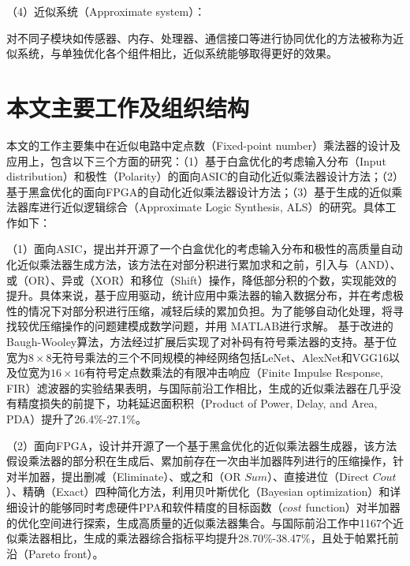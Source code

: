 （4）近似系统（Approximate system）：

对不同子模块如传感器、内存、处理器、通信接口等进行协同优化的方法被称为近似系统，与单独优化各个组件相比，近似系统能够取得更好的效果\cite{AC:Sys:camera}。




\section{本文主要工作及组织结构}

本文的工作主要集中在近似电路中定点数（Fixed-point number）乘法器的设计及应用上，包含以下三个方面的研究：（1）基于白盒优化的考虑输入分布（Input distribution）和极性（Polarity）的面向ASIC的自动化近似乘法器设计方法；（2）基于黑盒优化的面向FPGA的自动化近似乘法器设计方法；（3）基于生成的近似乘法器库进行近似逻辑综合（Approximate Logic Synthesis, ALS）\cite{AC:ALS:survey}的研究。具体工作如下：

（1）面向ASIC，提出并开源了一个白盒优化的考虑输入分布和极性的高质量自动化近似乘法器生成方法，该方法在对部分积进行累加求和之前，引入与（AND）、或（OR）、异或（XOR）和移位（Shift）操作，降低部分积的个数，实现能效的提升。具体来说，基于应用驱动，统计应用中乘法器的输入数据分布，并在考虑极性的情况下对部分积进行压缩，减轻后续的累加负担。为了能够自动化处理，将寻找较优压缩操作的问题建模成数学问题，并用 MATLAB进行求解。
基于改进的Baugh-Wooley算法\cite{EM:baugh-wooley,EM:baugh-wooley_modified_PP_reorga,EM:baugh-wooley_diff}，方法经过扩展后实现了对补码有符号乘法器的支持。基于位宽为$8\times8$无符号乘法的三个不同规模的神经网络包括LeNet、AlexNet和VGG16以及位宽为$16\times16$有符号定点数乘法的有限冲击响应（Finite Impulse Response, FIR）滤波器的实验结果表明，与国际前沿工作相比，生成的近似乘法器在几乎没有精度损失的前提下，功耗延迟面积积（Product of Power, Delay, and Area, PDA）提升了26.4\%-27.1\%。

（2）面向FPGA，设计并开源了一个基于黑盒优化的近似乘法器生成器，该方法假设乘法器的部分积在生成后、累加前存在一次由半加器阵列进行的压缩操作，针对半加器，提出删减（Eliminate）、或之和（OR $Sum$）、直接进位（Direct $Cout$）、精确（Exact）四种简化方法，利用贝叶斯优化（Bayesian optimization）和详细设计的能够同时考虑硬件PPA和软件精度的目标函数（$cost$ function）对半加器的优化空间进行探索，生成高质量的近似乘法器集合。与国际前沿工作中1167个近似乘法器相比，生成的乘法器综合指标平均提升28.70\%-38.47\%，且处于帕累托前沿（Pareto front）。

